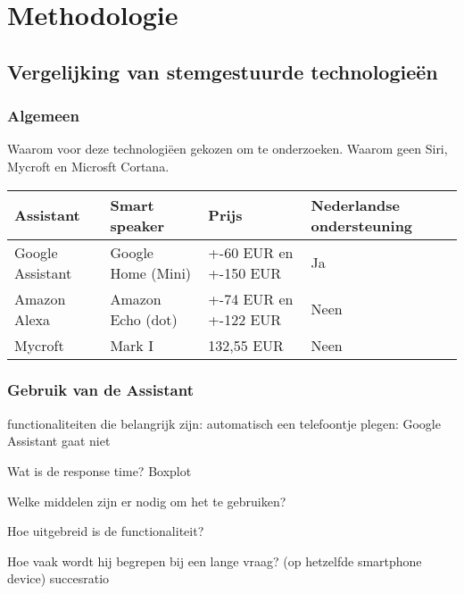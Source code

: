 
\chapter{Methodologie}
\label{ch:methodologie}

\section{Vergelijking van stemgestuurde technologieën}
\label{sec:vergelijking van stemgestuurde technologieën}

\subsection{Algemeen}
\label{sec:algemeen}

Waarom voor deze technologiëen gekozen om te onderzoeken. Waarom geen Siri, Mycroft en Microsft Cortana.

\begin{center}
    \begin{tabular}{ | l | l | l | l |}
        \hline
        Assistant & Smart speaker & Prijs & Nederlandse ondersteuning\\ \hline
        Google Assistant & Google Home (Mini) & +-60 EUR en +-150 EUR & Ja \\ \hline
        Amazon Alexa & Amazon Echo (dot) & +-74 EUR en +-122 EUR & Neen \\ \hline
        Mycroft & Mark I & 132,55 EUR & Neen \\ \hline
    \end{tabular}
\end{center}

\subsection{Gebruik van de Assistant}
\label{sec:gebruik van de assistant}
functionaliteiten die belangrijk zijn:
automatisch een telefoontje plegen: Google Assistant gaat niet

Wat is de response time? Boxplot

Welke middelen zijn er nodig om het te gebruiken?

Hoe uitgebreid is de functionaliteit?

Hoe vaak wordt hij begrepen bij een lange vraag? (op hetzelfde smartphone device) succesratio

